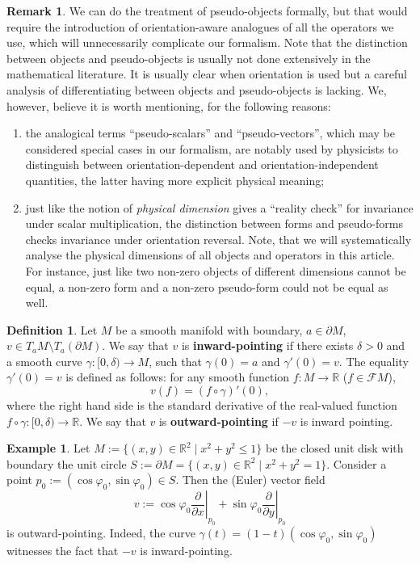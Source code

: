 \documentclass{elsarticle}
\theoremstyle{definition}
\newtheorem{definition}[theorem]{Definition}
\newtheorem{example}[theorem]{Example}
\newtheorem{remark}[theorem]{Remark}
\newcommand{\R}{\mathbb{R}}
\newcommand{\set}[2]{\{#1 \mid #2\}}
\newcommand{\restrict}[2]{\left.#1\right|_{#2}}
\newcommand{\newterm}[1]{\textbf{#1}}
\begin{document}
\begin{remark}
  We can do the treatment of pseudo-objects formally, but that would require the introduction of orientation-aware analogues of all the operators we use, which will unnecessarily complicate our formalism.
  Note that the distinction between objects and pseudo-objects is usually not done extensively in the mathematical literature. It is usually clear when orientation is used but a careful analysis of differentiating between objects and pseudo-objects is lacking.
  We, however, believe it is worth mentioning, for the following reasons:
  \begin{enumerate}
    \item
      the analogical terms ``pseudo-scalars'' and ``pseudo-vectors'', which may be considered special cases in our formalism,  are notably used by physicists to distinguish between orientation-dependent and orientation-independent quantities, the latter having more explicit physical meaning;
    \item
      just like the notion of \textit{physical dimension} gives a ``reality check'' for invariance under scalar multiplication,
      the distinction between forms and pseudo-forms checks invariance under orientation reversal. Note, that we will systematically analyse the physical dimensions of all objects and operators in this article.
      For instance, just like two non-zero objects of different dimensions cannot be equal, a non-zero form and a non-zero pseudo-form could not be equal as well.
  \end{enumerate}
\end{remark}
\begin{definition}
  Let $M$ be a smooth manifold with boundary,
  $a \in \partial M$,
  $v \in T_a M \setminus T_a({\partial M})$.
  We say that $v$ is \newterm{inward-pointing} if there exists $\delta > 0$ and a smooth curve $\gamma \colon [0, \delta) \to M$, such that $\gamma(0) = a$ and $\gamma'(0) = v$.
  The equality $\gamma'(0) = v$ is defined as follows: for any smooth function $f \colon M \to \R$ ($f \in \mathcal{F} M$),
  \begin{equation}
    v(f) = (f \circ \gamma)'(0),
  \end{equation}
  where the right hand side is the standard derivative of the real-valued function
  $f \circ \gamma \colon [0, \delta) \to \R$.
  We say that $v$ is \newterm{outward-pointing} if $-v$ is inward pointing.
\end{definition}
\begin{example}
  Let $M := \set{(x, y) \in \R^2}{x^2 + y^2 \leq 1}$ be the closed unit disk with boundary the unit circle $S := \partial M = \set{(x, y) \in \R^2}{x^2 + y^2 = 1}$.
  Consider a point $p_0 := (\cos \varphi_0, \sin \varphi_0) \in S$.
  Then the (Euler) vector field
  \begin{equation}
    v := \cos \varphi_0 \restrict{\frac{\partial}{\partial x}}{p_0} + \sin \varphi_0 \restrict{\frac{\partial}{\partial y}}{p_0}
  \end{equation}
  is outward-pointing.
  Indeed, the curve $\gamma(t) = (1 - t)(\cos \varphi_0, \sin \varphi_0)$ witnesses the fact that $-v$ is inward-pointing.
\end{example}
\end{document}
